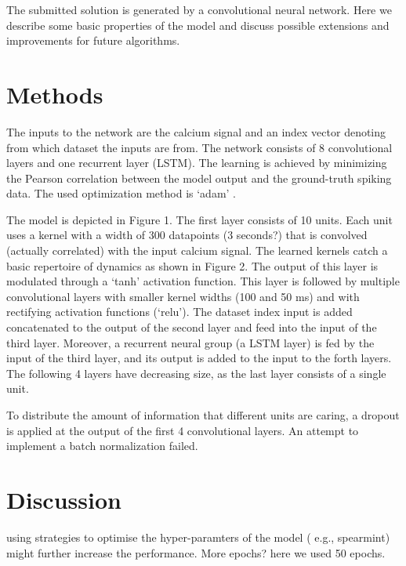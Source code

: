 \documentclass{report}
\begin{document}
The submitted solution is generated by a convolutional neural network. Here 
we describe some basic properties of the model and discuss possible extensions
and improvements for future algorithms.

\section*{Methods}

The inputs to the network are the calcium signal and an index vector denoting
from which dataset the inputs are from. The network consists of 8 convolutional
layers and one recurrent layer (LSTM). The learning is achieved by minimizing
the Pearson correlation between the model output and the ground-truth spiking
data. The used optimization method is `adam' \cite{Adam}.

The model is depicted in Figure 1. 
The first layer consists of 10 units. Each unit uses a kernel with a width of
300 datapoints (3 seconds?) that is convolved (actually correlated) with the
input calcium signal. The learned kernels catch a basic repertoire of dynamics
as shown in Figure 2. The output of this layer is modulated through a `tanh'
activation function. This layer is followed by multiple convolutional layers
with smaller kernel widths (100 and 50 ms) and with rectifying activation
functions (`relu'). The dataset index input is added concatenated to the output
of the second layer and feed into the input of the third layer. Moreover, a
recurrent neural group (a LSTM layer) is fed by the input of the third layer,
and its output is added to the input to the forth layers. The following 4 layers
have decreasing size, as the last layer consists of a single unit.

To distribute the amount of information that different units are caring, a
dropout is applied at the output of the first 4 convolutional layers. An
attempt to implement a batch normalization failed.

\section*{Discussion}
using strategies to optimise the hyper-paramters of the model ( e.g., spearmint) might further 
increase the performance. More epochs? here we used 50 epochs.
\end{document}
